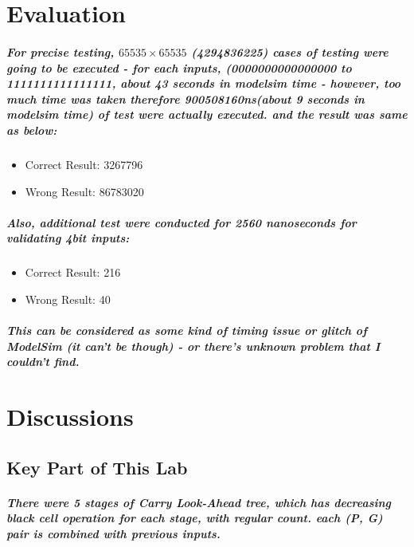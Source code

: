 \documentclass[a4paper]{report}
\begin{document}
    \chapter{Evaluation}
        \paragraph{\normalfont For precise testing, $65535 \times 65535$ (4294836225) cases of testing were going to be executed - for each inputs, (0000000000000000 to 1111111111111111, about 43 seconds in modelsim time - however, too much time was taken therefore 900508160ns(about 9 seconds in modelsim time) of test were actually executed. and the result was same as below:}

        \begin{itemize}
            \item Correct Result: 3267796
            \item Wrong Result: 86783020
        \end{itemize}

        \paragraph{\normalfont Also, additional test were conducted for 2560 nanoseconds for validating 4bit inputs: }

        \begin{itemize}
            \item Correct Result: 216
            \item Wrong Result: 40
        \end{itemize}

        \paragraph{\normalfont This can be considered as some kind of timing issue or glitch of ModelSim (it can't be though) - or there's unknown problem that I couldn't find.}

    \chapter{Discussions}
        \section{Key Part of This Lab}
            \paragraph{\normalfont There were 5 stages of Carry Look-Ahead tree, which has decreasing black cell operation for each stage, with regular count. each (P, G) pair is combined with previous inputs.}
\end{document}
